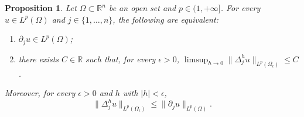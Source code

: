 \documentclass[a4paper,9pt]{amsart}
\newcommand{\R}{\mathbb{R}}	%
\newcommand{\de}{\partial}		%
\newcommand{\THEN}{\Rightarrow}	%
\theoremstyle{plain}
\newtheorem{proposition}{Proposition}[section]
\theoremstyle{definition}
\theoremstyle{remark}
\begin{document}
\begin{proposition}\label{prop68176bc1}
	Let $\Omega\subset\R^n$ be an open set and $p\in(1,+\infty]$.
	For every $u\in L^p(\Omega)$ and $j\in\{1,\dots,n\}$,
	the following are equivalent:
	\begin{enumerate}[label=(\roman*)]
	\item\label{prop68176bc1_1}
	$\de_ju\in L^p(\Omega)$; %
	\item\label{prop68176bc1_2}
	there exists $C\in\R$ such that, for every $\epsilon>0$, 
	$\limsup_{h\to0} \|\Delta_j^h u \|_{L^p(\Omega_\epsilon)} \le C$.
	\end{enumerate}
	Moreover, for every $\epsilon>0$ and $h$ with $|h|<\epsilon$,
	\begin{equation}\label{eq68176675}
		\|\Delta_j^h u \|_{L^p(\Omega_\epsilon)} \le \|\de_ju\|_{L^p(\Omega)} .
	\end{equation}
\end{proposition}
\end{document}
